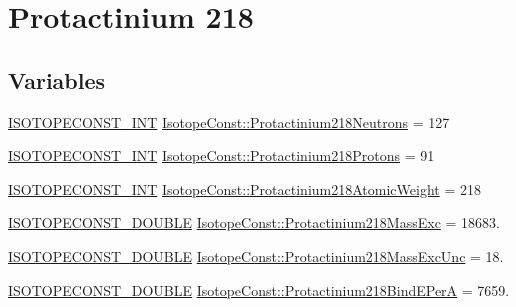 \hypertarget{group___isotope_const-_protactinium-_pa218}{}\section{Protactinium 218}
\label{group___isotope_const-_protactinium-_pa218}
\subsection*{Variables}
\begin{DoxyCompactItemize}
\item 
\mbox{\hyperlink{group___isotope_const-_macros_ga5f18360b3e99483a35c32d789e62621c}{I\+S\+O\+T\+O\+P\+E\+C\+O\+N\+S\+T\+\_\+\+I\+NT}} \mbox{\hyperlink{group___isotope_const-_protactinium-_pa218_gacc41c9857b9e69d864ebfc5b8549e579}{Isotope\+Const\+::\+Protactinium218\+Neutrons}} = 127
\item 
\mbox{\hyperlink{group___isotope_const-_macros_ga5f18360b3e99483a35c32d789e62621c}{I\+S\+O\+T\+O\+P\+E\+C\+O\+N\+S\+T\+\_\+\+I\+NT}} \mbox{\hyperlink{group___isotope_const-_protactinium-_pa218_ga100b6231bb57fe8a3ea5161f7aa971a5}{Isotope\+Const\+::\+Protactinium218\+Protons}} = 91
\item 
\mbox{\hyperlink{group___isotope_const-_macros_ga5f18360b3e99483a35c32d789e62621c}{I\+S\+O\+T\+O\+P\+E\+C\+O\+N\+S\+T\+\_\+\+I\+NT}} \mbox{\hyperlink{group___isotope_const-_protactinium-_pa218_gad0d85e6f25eef38bf7507c10c9cc79ed}{Isotope\+Const\+::\+Protactinium218\+Atomic\+Weight}} = 218
\item 
\mbox{\hyperlink{group___isotope_const-_macros_ga8f45a7272ce02c0b4c65c44636ed719a}{I\+S\+O\+T\+O\+P\+E\+C\+O\+N\+S\+T\+\_\+\+D\+O\+U\+B\+LE}} \mbox{\hyperlink{group___isotope_const-_protactinium-_pa218_ga65031de78224e0fe070dc9d942881e3f}{Isotope\+Const\+::\+Protactinium218\+Mass\+Exc}} = 18683.
\item 
\mbox{\hyperlink{group___isotope_const-_macros_ga8f45a7272ce02c0b4c65c44636ed719a}{I\+S\+O\+T\+O\+P\+E\+C\+O\+N\+S\+T\+\_\+\+D\+O\+U\+B\+LE}} \mbox{\hyperlink{group___isotope_const-_protactinium-_pa218_gaaadc2e4139b643a339886bd16f6bdf92}{Isotope\+Const\+::\+Protactinium218\+Mass\+Exc\+Unc}} = 18.
\item 
\mbox{\hyperlink{group___isotope_const-_macros_ga8f45a7272ce02c0b4c65c44636ed719a}{I\+S\+O\+T\+O\+P\+E\+C\+O\+N\+S\+T\+\_\+\+D\+O\+U\+B\+LE}} \mbox{\hyperlink{group___isotope_const-_protactinium-_pa218_ga482329c4294bfbdc3a2fc8790aa3e13f}{Isotope\+Const\+::\+Protactinium218\+Bind\+E\+PerA}} = 7659.

\end{DoxyCompactItemize}
